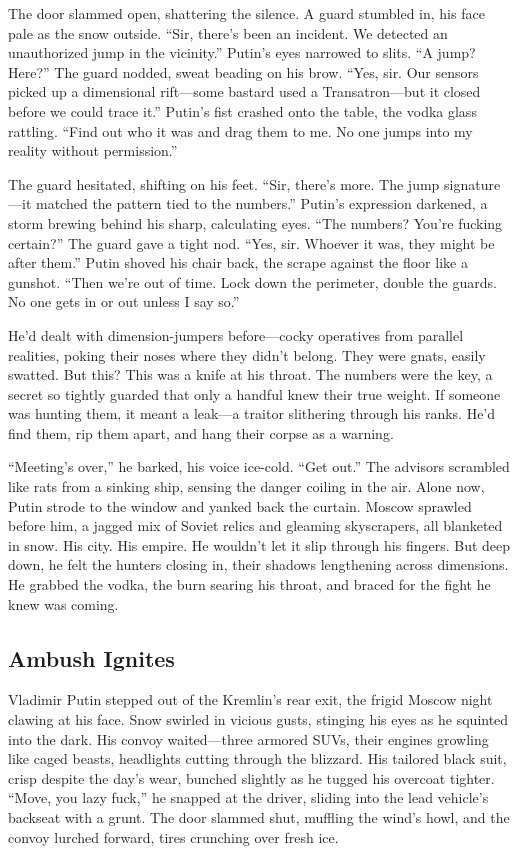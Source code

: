 \documentclass[12pt]{book}
\begin{document}
The door slammed open, shattering the silence. A guard stumbled in, his face pale as the snow outside. ``Sir, there’s been an incident. We detected an unauthorized jump in the vicinity.'' Putin’s eyes narrowed to slits. ``A jump? Here?'' The guard nodded, sweat beading on his brow. ``Yes, sir. Our sensors picked up a dimensional rift---some bastard used a Transatron---but it closed before we could trace it.'' Putin’s fist crashed onto the table, the vodka glass rattling. ``Find out who it was and drag them to me. No one jumps into my reality without permission.''

The guard hesitated, shifting on his feet. ``Sir, there’s more. The jump signature---it matched the pattern tied to the numbers.'' Putin’s expression darkened, a storm brewing behind his sharp, calculating eyes. ``The numbers? You’re fucking certain?'' The guard gave a tight nod. ``Yes, sir. Whoever it was, they might be after them.'' Putin shoved his chair back, the scrape against the floor like a gunshot. ``Then we’re out of time. Lock down the perimeter, double the guards. No one gets in or out unless I say so.''

He’d dealt with dimension-jumpers before---cocky operatives from parallel realities, poking their noses where they didn’t belong. They were gnats, easily swatted. But this? This was a knife at his throat. The numbers were the key, a secret so tightly guarded that only a handful knew their true weight. If someone was hunting them, it meant a leak---a traitor slithering through his ranks. He’d find them, rip them apart, and hang their corpse as a warning.

``Meeting’s over,'' he barked, his voice ice-cold. ``Get out.'' The advisors scrambled like rats from a sinking ship, sensing the danger coiling in the air. Alone now, Putin strode to the window and yanked back the curtain. Moscow sprawled before him, a jagged mix of Soviet relics and gleaming skyscrapers, all blanketed in snow. His city. His empire. He wouldn’t let it slip through his fingers. But deep down, he felt the hunters closing in, their shadows lengthening across dimensions. He grabbed the vodka, the burn searing his throat, and braced for the fight he knew was coming.

\subsection{Ambush Ignites}

Vladimir Putin stepped out of the Kremlin's rear exit, the frigid Moscow night clawing at his face. Snow swirled in vicious gusts, stinging his eyes as he squinted into the dark. His convoy waited—three armored SUVs, their engines growling like caged beasts, headlights cutting through the blizzard. His tailored black suit, crisp despite the day’s wear, bunched slightly as he tugged his overcoat tighter. “Move, you lazy fuck,” he snapped at the driver, sliding into the lead vehicle’s backseat with a grunt. The door slammed shut, muffling the wind’s howl, and the convoy lurched forward, tires crunching over fresh ice.
\end{document}
